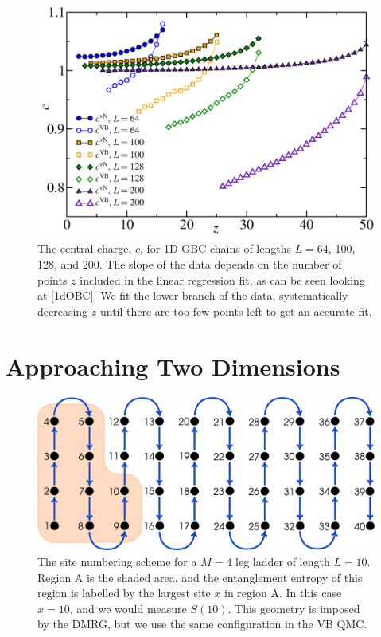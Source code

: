 \begin{figure} {
\includegraphics[width=6in]{./figures/paper1/figure1/newfig2.pdf} 
\centering
	\caption[Values of the conformal charge from the 1D open boundary results]{ The central charge, $c$, for 1D OBC chains of lengths $L=64$, 100, 128, and 200.
The slope of the data depends on the number of points $z$ included in the linear regression fit, as can be seen looking at \ref{1dOBC}.
We fit the lower branch of the data, systematically decreasing $z$ until there are too few points left to get an accurate fit.
\label{c2}
}}
\end{figure}


\section{Approaching Two Dimensions}

\begin{figure} { \includegraphics[width=6in]{./figures/made/stuff_covering.pdf}
\centering
\caption[Geometry of a four-leg ladder]{
The site numbering scheme for a $M=4$ leg ladder of length $L=10$.  Region A is the shaded area, and the entanglement entropy of this region is labelled by the largest site $x$ in region A.
In this case $x=10$, and we would measure $S(10)$.  
This geometry is imposed by the DMRG, but we use the same configuration in the VB QMC.
 \label{laddersnake} }} 
 \end{figure}

